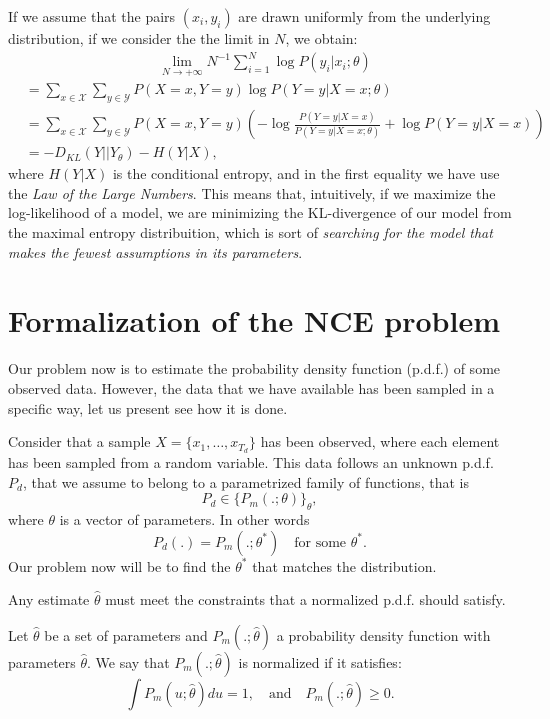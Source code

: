 \begin{remark}
If we assume that the pairs $(x_i,y_i)$ are drawn uniformly from the underlying distribution, if we consider the the limit in $N$, we obtain:
\begin{align*}
    &\hspace{4cm} \lim_{N \to + \infty} N^{-1}\sum_{i=1}^N \log P(y_i|x_i;\theta) \\
    &  = \sum_{x\in \mathcal X}\sum_{y \in \mathcal Y} P(X = x,Y = y) \log P(Y = y | X = x; \theta)\\
    & = \sum_{x\in \mathcal X}\sum_{y \in \mathcal Y} P(X = x,Y = y) \left( - \log \frac{P(Y = y | X = x)}{P(Y = y | X = x; \theta)} + \log P(Y = y | X = x) \right) \\
    & = - D_{KL}(Y || Y_\theta) - H(Y|X),
\end{align*}
where $H(Y|X)$ is the conditional entropy, and in the first equality we have use the \emph{Law of the Large Numbers}. This means that, intuitively, if we maximize the log-likelihood of a model, we are minimizing the KL-divergence of our model from the maximal entropy distribuition, which is sort of \emph{searching for the model that makes the fewest assumptions in its parameters}.
\end{remark}


 


\section{Formalization of the NCE problem}

Our problem now is to estimate the probability density function (p.d.f.) of some observed data. However, the data that we have available has been sampled in a specific way, let us present see how it is done.

Consider that a sample $X = \{x_1,\dots,x_{T_d}\}$  has been observed, where each element has been sampled from a random variable. This data follows an unknown p.d.f. $P_d$, that we assume to belong to a parametrized family of functions, that is
\[
P_d \in \{P_m(.;\theta)\}_\theta,
\]
where $\theta$ is a vector of parameters. In other words
$$
P_d(.) = P_m(.;\theta^*) \quad \text{for some } \theta^*.
$$
Our problem now will be to find the $\theta^*$ that matches the distribution. 

Any estimate $\hat{\theta}$ must meet the constraints that a normalized p.d.f. should satisfy.


\begin{ndef}
Let $\hat{\theta}$ be a set of parameters and $P_m(.;\hat{\theta})$ a probability density function with parameters $\hat{\theta}$. We say that $P_m(.;\hat{\theta})$ is normalized if it satisfies:
$$
\int P_m(u;\hat{\theta})du = 1, \quad \text{and}\quad P_m(.;\hat{\theta})\geq 0.
$$
\end{ndef}

